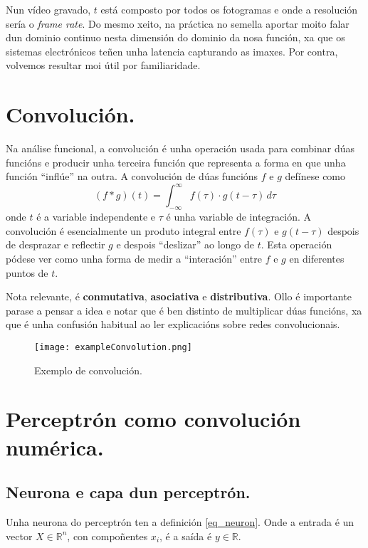 \documentclass{article}
\begin{document}
Nun vídeo gravado, $t$ está composto por todos os fotogramas e onde a resolución sería o \textit{frame rate}. Do mesmo xeito, na práctica no semella aportar moito falar dun dominio continuo nesta dimensión do dominio da nosa función, xa que os sistemas electrónicos teñen unha latencia capturando as imaxes. Por contra, volvemos resultar moi útil por familiaridade. 

\section{Convolución.}

Na análise funcional, a convolución é unha operación usada para combinar dúas funcións e producir unha terceira función que representa a forma en que unha función ``inflúe'' na outra. A convolución de dúas funcións \(f\) e \(g\) defínese como
\[
(f * g)(t) = \int_{-\infty}^{\infty} f(\tau) \cdot g(t - \tau) \, d\tau
\]
onde \(t\) é a variable independente e \(\tau\) é unha variable de integración. A convolución é esencialmente un produto integral entre \(f(\tau)\) e \(g(t - \tau)\) despois de desprazar e reflectir \(g\) e despois ``deslizar'' ao longo de \(t\). Esta operación pódese ver como unha forma de medir a ``interación'' entre \(f\) e \(g\) en diferentes puntos de \(t\).

Nota relevante, é \textbf{conmutativa}, \textbf{asociativa} e \textbf{distributiva}.  Ollo é importante parase a pensar a idea e notar que é ben distinto de multiplicar dúas funcións, xa que é unha confusión habitual ao ler explicacións sobre redes convolucionais. 


\begin{figure}[h]
    \centering
    \texttt{[image: exampleConvolution.png]}
    \caption{Exemplo de convolución.}
    \label{fig:enter-label}
\end{figure}

\section{Perceptrón como convolución numérica. }

\subsection{Neurona e capa dun perceptrón. }
Unha neurona do perceptrón ten a definición \ref{eq_neuron}. Onde a entrada é un vector $X \in \mathbb{R}^n $, con compoñentes $x_i$, é a saída é $y \in \mathbb{R}$.
\end{document}
